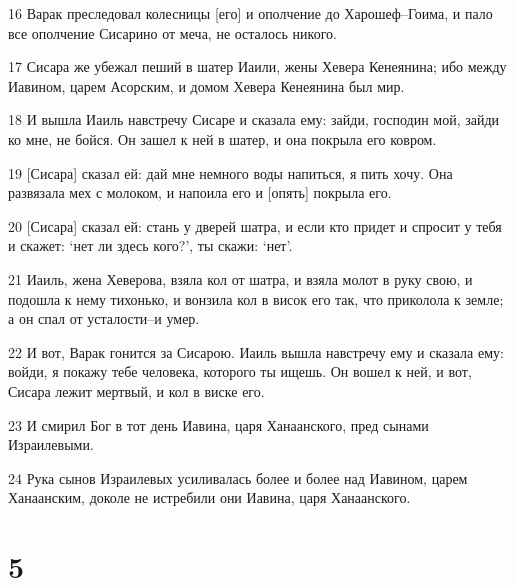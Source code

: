 \par 16 Варак преследовал колесницы [его] и ополчение до Харошеф--Гоима, и пало все ополчение Сисарино от меча, не осталось никого.
\par 17 Сисара же убежал пеший в шатер Иаили, жены Хевера Кенеянина; ибо между Иавином, царем Асорским, и домом Хевера Кенеянина был мир.
\par 18 И вышла Иаиль навстречу Сисаре и сказала ему: зайди, господин мой, зайди ко мне, не бойся. Он зашел к ней в шатер, и она покрыла его ковром.
\par 19 [Сисара] сказал ей: дай мне немного воды напиться, я пить хочу. Она развязала мех с молоком, и напоила его и [опять] покрыла его.
\par 20 [Сисара] сказал ей: стань у дверей шатра, и если кто придет и спросит у тебя и скажет: `нет ли здесь кого?', ты скажи: `нет'.
\par 21 Иаиль, жена Хеверова, взяла кол от шатра, и взяла молот в руку свою, и подошла к нему тихонько, и вонзила кол в висок его так, что приколола к земле; а он спал от усталости--и умер.
\par 22 И вот, Варак гонится за Сисарою. Иаиль вышла навстречу ему и сказала ему: войди, я покажу тебе человека, которого ты ищешь. Он вошел к ней, и вот, Сисара лежит мертвый, и кол в виске его.
\par 23 И смирил Бог в тот день Иавина, царя Ханаанского, пред сынами Израилевыми.
\par 24 Рука сынов Израилевых усиливалась более и более над Иавином, царем Ханаанским, доколе не истребили они Иавина, царя Ханаанского.

\chapter{5}

